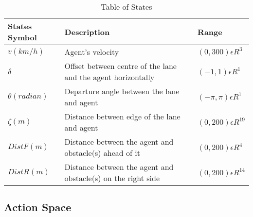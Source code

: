 \begin{table}[h]
	\centering
	\caption{Table of States \cite{huang2019end} }
	\smallskip
	\begin{tabular}{ |p{3cm}|p{6cm}|p{3cm}|  }
		
		\hline
		\textbf{States Symbol}  & \textbf{Description}  &\textbf{Range} \\
		
		\hline
		\hline
		$v (km/h ) $ & Agent's velocity &$ (0, 300) \epsilon R^3 $ \\
		\hline
		$\delta$ & Offset between centre of the lane and the agent horizontally   & $(-1, 1) \epsilon R^1 $ \\
		\hline
		$\theta ( radian ) $ &Departure angle between the lane and agent & $(-\pi, \pi) \epsilon R^1$ \\
		\hline
		$\zeta(m) $  &Distance between edge of the lane and agent & $(0, 200) \epsilon R^{19} $ \\
		
		\hline
		$DistF (m) $  &Distance between the agent and obstacle(s) ahead of it & $(0, 200) \epsilon R^{4} $ \\
		
		\hline
		$DistR(m) $  &Distance between the agent and obstacle(s) on the right side & $(0, 200) \epsilon R^{14} $ \\
		
		\hline
	\end{tabular}
	
	\label{table:1}
\end{table}

\subsection{Action Space}

